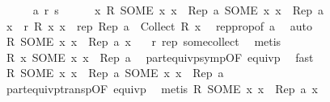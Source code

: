 \begin{isabellebody}
\ \ \ \ \isamarkupfalse%
\ a\ r\ s\isanewline
\ \ \ \ \isamarkupfalse%
\ x{\isacharcolon}{\kern0pt}\ {\isachardoublequoteopen}R\ {\isacharparenleft}{\kern0pt}SOME\ x{\isachardot}{\kern0pt}\ x\ {\isasymin}\ Rep\ a{\isacharparenright}{\kern0pt}\ {\isacharparenleft}{\kern0pt}SOME\ x{\isachardot}{\kern0pt}\ x\ {\isasymin}\ Rep\ a{\isacharparenright}{\kern0pt}{\isachardoublequoteclose}\ \isamarkupfalse%
\ {\isacharminus}{\kern0pt}\isanewline
\ \ \ \ \ \ \isamarkupfalse%
\ x\ \ r{\isacharcolon}{\kern0pt}\ {\isachardoublequoteopen}R\ x\ x{\isachardoublequoteclose}\ \ rep{\isacharcolon}{\kern0pt}\ {\isachardoublequoteopen}Rep\ a\ {\isacharequal}{\kern0pt}\ Collect\ {\isacharparenleft}{\kern0pt}R\ x{\isacharparenright}{\kern0pt}{\isachardoublequoteclose}\ \isamarkupfalse%
\ rep{\isacharunderscore}{\kern0pt}prop{\isacharbrackleft}{\kern0pt}of\ a{\isacharbrackright}{\kern0pt}\ \isamarkupfalse%
\ auto\isanewline
\ \ \ \ \ \ \isamarkupfalse%
\ {\isachardoublequoteopen}R\ {\isacharparenleft}{\kern0pt}SOME\ x{\isachardot}{\kern0pt}\ x\ {\isasymin}\ Rep\ a{\isacharparenright}{\kern0pt}\ x{\isachardoublequoteclose}\ \ \isamarkupfalse%
\ r\ rep\ some{\isacharunderscore}{\kern0pt}collect\ \isamarkupfalse%
\ metis\isanewline
\ \ \ \ \ \ \isamarkupfalse%
\ \isamarkupfalse%
\ {\isachardoublequoteopen}R\ x\ {\isacharparenleft}{\kern0pt}SOME\ x{\isachardot}{\kern0pt}\ x\ {\isasymin}\ Rep\ a{\isacharparenright}{\kern0pt}{\isachardoublequoteclose}\ \isamarkupfalse%
\ part{\isacharunderscore}{\kern0pt}equivp{\isacharunderscore}{\kern0pt}symp{\isacharbrackleft}{\kern0pt}OF\ equivp{\isacharbrackright}{\kern0pt}\ \isamarkupfalse%
\ fast\isanewline
\ \ \ \ \ \ \isamarkupfalse%
\ \isamarkupfalse%
\ {\isachardoublequoteopen}R\ {\isacharparenleft}{\kern0pt}SOME\ x{\isachardot}{\kern0pt}\ x\ {\isasymin}\ Rep\ a{\isacharparenright}{\kern0pt}\ {\isacharparenleft}{\kern0pt}SOME\ x{\isachardot}{\kern0pt}\ x\ {\isasymin}\ Rep\ a{\isacharparenright}{\kern0pt}{\isachardoublequoteclose}\isanewline
\ \ \ \ \ \ \ \ \isamarkupfalse%
\ part{\isacharunderscore}{\kern0pt}equivp{\isacharunderscore}{\kern0pt}transp{\isacharbrackleft}{\kern0pt}OF\ equivp{\isacharbrackright}{\kern0pt}\ \isamarkupfalse%
\ {\isacharparenleft}{\kern0pt}metis\ {\isacartoucheopen}R\ {\isacharparenleft}{\kern0pt}SOME\ x{\isachardot}{\kern0pt}\ x\ {\isasymin}\ Rep\ a{\isacharparenright}{\kern0pt}\ x{\isacartoucheclose}{\isacharparenright}{\kern0pt}\isanewline

\end{isabellebody}
